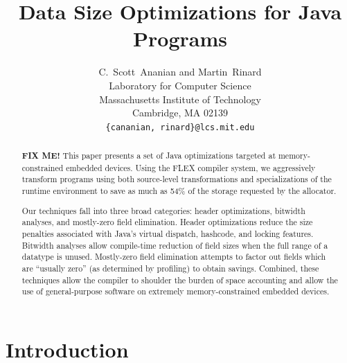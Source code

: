 \documentclass[preprint]{acmconf}
\title{\bf Data Size Optimizations for Java Programs}
\author{C.~Scott~Ananian and Martin~Rinard\\
        Laboratory for Computer Science\\
        Massachusetts Institute of Technology\\ 
        Cambridge, MA 02139 \\ 
        {\tt \{cananian, rinard\}@lcs.mit.edu} }
\begin{document}


\maketitle

\begin{abstract}

{\bf\Large FIX ME! }
This paper presents a set of Java optimizations targeted at
memory-constrained embedded devices.  Using the FLEX compiler system,
we aggressively transform
programs using both source-level transformations and
specializations of the runtime environment to save as much
as 54\% of the storage requested by the allocator.

Our techniques fall into three broad categories: header optimizations,
bitwidth analyses, and mostly-zero field elimination.  Header
optimizations reduce the size penalties associated with 
Java's virtual dispatch, hashcode, and locking features.  Bitwidth
analyses allow compile-time reduction of field sizes when the
full range of a datatype is unused.  Mostly-zero field elimination
attempts to factor out fields which are ``usually zero'' (as
determined by profiling) to obtain savings.  Combined, these
techniques allow the compiler to shoulder the burden of space accounting
and allow the use of general-purpose software on extremely
memory-constrained embedded devices.

\end{abstract}

\section{Introduction}
\end{document}
